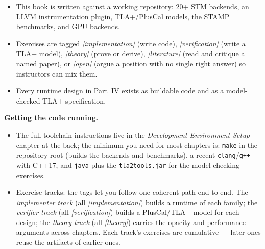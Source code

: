 \begin{itemize}
    \item This book is written against a working repository: 20+ STM backends, an LLVM instrumentation plugin, TLA+/PlusCal models, the STAMP benchmarks, and GPU backends.
    \item Exercises are tagged \emph{[implementation]} (write code), \emph{[verification]} (write a TLA+ model), \emph{[theory]} (prove or derive), \emph{[literature]} (read and critique a named paper), or \emph{[open]} (argue a position with no single right answer) so instructors can mix them.
    \item Every runtime design in Part~IV exists as buildable code and as a model-checked TLA+ specification.
\end{itemize}
\textbf{Getting the code running.}
\begin{itemize}
    \item The full toolchain instructions live in the \emph{Development Environment Setup} chapter at the back; the minimum you need for most chapters is: \texttt{make} in the repository root (builds the backends and benchmarks), a recent \texttt{clang}/\texttt{g++} with C++17, and \texttt{java} plus the \texttt{tla2tools.jar} for the model-checking exercises.
    \item Exercise tracks: the tags let you follow one coherent path end-to-end. The \emph{implementer track} (all \emph{[implementation]}) builds a runtime of each family; the \emph{verifier track} (all \emph{[verification]}) builds a PlusCal/TLA+ model for each design; the \emph{theory track} (all \emph{[theory]}) carries the opacity and performance arguments across chapters. Each track's exercises are cumulative --- later ones reuse the artifacts of earlier ones.
\end{itemize}
